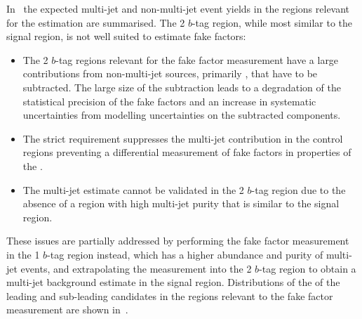 In~ the expected multi-jet and non-multi-jet
event yields in the regions relevant for the \faketauhadvis estimation
are summarised. The 2 $b$-tag region, while most similar to the signal
region, is not well suited to estimate fake factors:
\begin{itemize}

\item The 2 $b$-tag regions relevant for the fake factor measurement
  have a large contributions from non-multi-jet sources, primarily
  \ttbarFakes, that have to be subtracted. The large size of the
  subtraction leads to a degradation of the statistical precision of
  the fake factors and an increase in systematic uncertainties from
  modelling uncertainties on the subtracted components.

\item The strict \btag requirement suppresses the multi-jet
  contribution in the control regions preventing a differential
  measurement of fake factors in properties of the \tauhadvis.

\item The multi-jet estimate cannot be validated in the 2 $b$-tag
  region due to the absence of a region with high multi-jet purity
  that is similar to the signal region.

\end{itemize}
These issues are partially addressed by performing the fake factor
measurement in the 1 $b$-tag region instead, which has a higher
abundance and purity of multi-jet events, and extrapolating the
measurement into the 2 $b$-tag region to obtain a multi-jet background
estimate in the signal region. Distributions of the \pT of the leading
and sub-leading \tauhadvis candidates in the regions relevant to the
fake factor measurement are shown in~.

